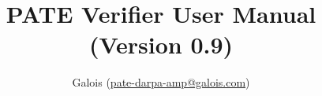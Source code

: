 \documentclass[11pt]{article}
\title{PATE Verifier User Manual (Version 0.9)}
\author{Galois (\href{mailto:pate-darpa-amp@galois.com}{pate-darpa-amp@galois.com})}
\begin{document}
{\let\newpage\relax\maketitle}


\newpage
\tableofcontents
\newpage

\acresetall






\clearpage

\end{document}
